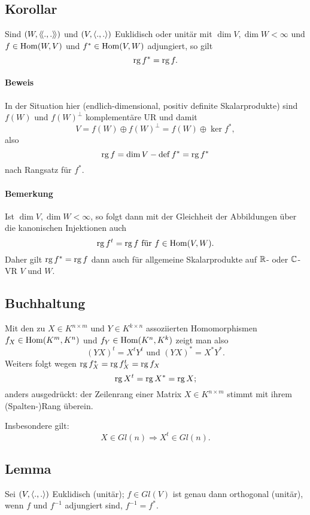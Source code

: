 \subsection{Korollar}
\begin{Korollar}[]
	Sind $ (W,\langle\! \langle .,. \rangle\! \rangle) $ und $ (V,\langle .,. \rangle) $ Euklidisch oder unitär mit $ \dim V, \dim W < \infty $ und $ f\in \operatorname{Hom}(W,V) $ und $ f^*\in \operatorname{Hom}(V,W) $ adjungiert, so gilt
		\[ \operatorname{rg} f^* = \operatorname{rg} f. \]
\end{Korollar}
\paragraph{Beweis}
	In der Situation hier (endlich-dimensional, positiv definite Skalarprodukte) sind $ f(W) $ und $ f(W)^\perp $ komplementäre UR und damit
		\[ V = f(W)\oplus f(W)^\perp = f(W)\oplus \ker f^*, \]
	also
		\[ \operatorname{rg} f = \dim V-\operatorname{def} f^* = \operatorname{rg} f^* \]
	nach Rangsatz für $ f^* $.
\paragraph{Bemerkung}
	Ist $ \dim V, \dim W <\infty $, so folgt dann mit der Gleichheit der Abbildungen über die kanonischen Injektionen auch
		\[ \operatorname{rg} f^t = \operatorname{rg} f \text{ für } f\in \operatorname{Hom}(V,W). \]
	Daher gilt $ \operatorname{rg} f^* = \operatorname{rg} f $ dann auch für allgemeine Skalarprodukte auf $ \mathbb{R} $- oder $ \mathbb{C} $-VR $ V $ und $ W $.

\subsection{Buchhaltung}
	Mit den zu $ X\in K^{n\times m} $ und $ Y\in K^{k\times n} $ assoziierten Homomorphismen $ f_X\in \operatorname{Hom}(K^m,K^n) $ und $ f_Y\in \operatorname{Hom}(K^n,K^k) $ zeigt man also
		\[ (YX)^t = X^tY^t \text{ und } (YX)^* = X^*Y^*. \]
	Weiters folgt wegen $ \operatorname{rg} f_X^* = \operatorname{rg} f_X^t = \operatorname{rg} f_X $
		\[ \operatorname{rg} X^t = \operatorname{rg} X^* = \operatorname{rg} X; \]
	anders ausgedrückt: der Zeilenrang einer Matrix $ X\in K^{n\times m} $ stimmt mit ihrem (Spalten-)Rang überein.
	
	Insbesondere gilt:
		\[ X\in Gl(n) \Rightarrow X^t \in Gl(n). \]
		
\subsection{Lemma}
\begin{Lemma}[]
	Sei $ (V,\langle .,. \rangle) $ Euklidisch (unitär); $ f\in Gl(V) $ ist genau dann orthogonal (unitär), wenn $ f $ und $ f^{-1} $ adjungiert sind, $ f^{-1} = f^* $.
\end{Lemma}
